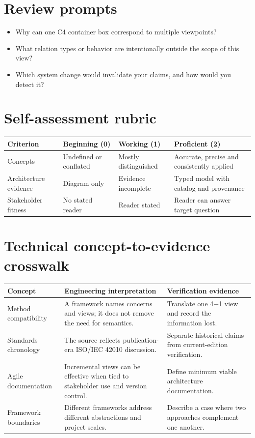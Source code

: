 \documentclass[10pt,letterpaper]{article}
\begin{document}
\section{Review prompts}
\begin{itemize}
\item Why can one C4 container box correspond to multiple viewpoints?
\item What relation types or behavior are intentionally outside the scope of this view?
\item Which system change would invalidate your claims, and how would you detect it?
\end{itemize}
\section{Self-assessment rubric}
\small
\begin{tabularx}{\linewidth}{@{}YYYY@{}}
\toprule
\textbf{Criterion} & \textbf{Beginning (0)} & \textbf{Working (1)} & \textbf{Proficient (2)} \\
\midrule
Concepts & Undefined or conflated & Mostly distinguished & Accurate, precise and consistently applied \\
Architecture evidence & Diagram only & Evidence incomplete & Typed model with catalog and provenance \\
Stakeholder fitness & No stated reader & Reader stated & Reader can answer target question \\
\bottomrule
\end{tabularx}
\normalsize
\section{Technical concept-to-evidence crosswalk}
\small
\begin{tabularx}{\linewidth}{@{}YYY@{}}
\toprule
\textbf{Concept} & \textbf{Engineering interpretation} & \textbf{Verification evidence} \\
\midrule
Method compatibility & A framework names concerns and views; it does not remove the need for semantics. & Translate one 4+1 view and record the information lost. \\
Standards chronology & The source reflects publication-era ISO/IEC 42010 discussion. & Separate historical claims from current-edition verification. \\
Agile documentation & Incremental views can be effective when tied to stakeholder use and version control. & Define minimum viable architecture documentation. \\
Framework boundaries & Different frameworks address different abstractions and project scales. & Describe a case where two approaches complement one another. \\
\bottomrule
\end{tabularx}
\normalsize
\end{document}
